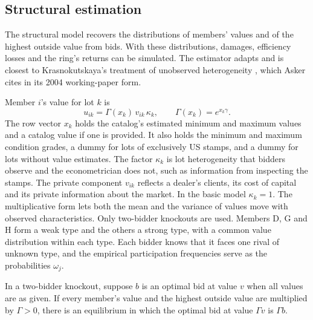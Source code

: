\subsection{Structural estimation}\label{sec:13-asker-structural}

The structural model recovers the distributions of members' values and of the highest outside value from bids.
With these distributions, damages, efficiency losses and the ring's returns can be simulated. The estimator
adapts \citet{GuerrePerrigneVuong2000} and is closest to Krasnokutskaya's treatment of unobserved heterogeneity
\citep{Krasnokutskaya2011}, which Asker cites in its 2004 working-paper form.

Member $i$'s value for lot $k$ is
\begin{equation}\label{eq:13-asker-value}
u_{ik}=\Gamma(x_k)\,v_{ik}\,\kappa_k,\qquad\Gamma(x_k)=e^{x_k\gamma}.
\end{equation}
The row vector $x_k$ holds the catalog's estimated minimum and maximum values and a catalog value if one is
provided. It also holds the minimum and maximum condition grades, a dummy for lots of exclusively US stamps,
and a dummy for lots without value estimates. The factor $\kappa_k$ is lot heterogeneity that bidders observe and the
econometrician does not, such as information from inspecting the stamps. The private component $v_{ik}$ reflects
a dealer's clients, its cost of capital and its private information about the market. In the basic model
$\kappa_k=1$. The multiplicative form lets both the mean and the variance of values move with observed
characteristics. Only two-bidder knockouts are used. Members D, G and H form a weak type and the others a strong
type, with a common value distribution within each type. Each bidder knows that it faces one rival of unknown
type, and the empirical participation frequencies serve as the probabilities $\omega_j$.

\begin{lemma}\label{lem:13-asker-homog}
In a two-bidder knockout, suppose $b$ is an optimal bid at value $v$ when all values are as given. If every
member's value and the highest outside value are multiplied by $\Gamma>0$, there is an equilibrium in which the
optimal bid at value $\Gamma v$ is $\Gamma b$.
\end{lemma}

